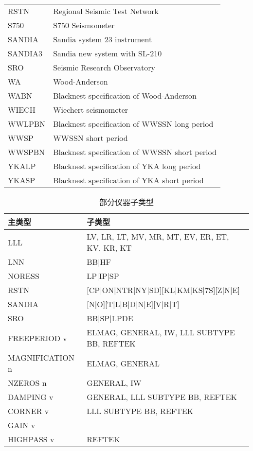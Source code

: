 \begin{table}[tp]
\begin{tabular}{ll}
RSTN     &  Regional Seismic Test Network	\\
S750     &  S750 Seismometer	\\
SANDIA   &  Sandia system 23 instrument	\\
SANDIA3  &  Sandia new system with SL-210	\\
SRO      &  Seismic Research Observatory	\\
WA       &  Wood-Anderson	\\
WABN     &  Blacknest specification of Wood-Anderson	\\
WIECH    &  Wiechert seismometer	\\
WWLPBN   &  Blacknest specification of WWSSN long period	\\
WWSP     &  WWSSN short period	\\
WWSPBN   &  Blacknest specification of WWSSN short period	\\
YKALP    &  Blacknest specification of YKA long period	\\
YKASP    &  Blacknest specification of YKA short period	\\
\bottomrule
\end{tabular}
\end{table}

\begin{table}[htb]
\centering
\ttfamily
\small
\caption{部分仪器子类型}
\label{table:instrument-subtype}
\begin{tabular}{ll}
\toprule
主类型	&	子类型	\\
\midrule
LLL       &       LV, LR, LT, MV, MR, MT, EV, ER, ET, KV, KR, KT	\\
LNN       &    	  BB|HF	                                \\
NORESS    &   	  LP|IP|SP	                            \\
RSTN      &    	  [CP|ON|NTR|NY|SD][KL|KM|KS|7S][Z|N|E]	\\
SANDIA    &   	  [N|O][T|L|B|D|N|E][V|R|T]	            \\
SRO       &       BB|SP|LPDE	                        \\
FREEPERIOD v &    ELMAG, GENERAL, IW, LLL SUBTYPE BB, REFTEK    \\
MAGNIFICATION n & ELMAG, GENERAL  \\
NZEROS n &     	  GENERAL, IW	\\
DAMPING v &    	  GENERAL, LLL SUBTYPE BB, REFTEK	\\
CORNER v &    	  LLL SUBTYPE BB, REFTEK	\\
GAIN v &		    \\
HIGHPASS v &	  REFTEK	\\
\bottomrule
\end{tabular}
\end{table}

